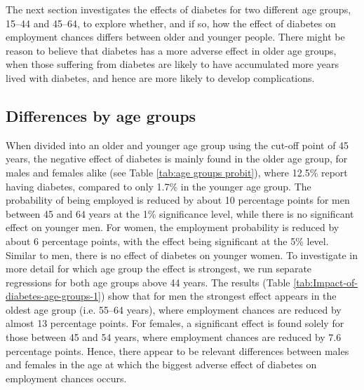 The next section investigates the effects of diabetes for
two different age groups, 15--44 and 45--64, to explore whether, and
if so, how the effect of diabetes on employment chances differs between
older and younger people. There might be reason to believe that diabetes
has a more adverse effect in older age groups, when those suffering
from diabetes are likely to have accumulated more years lived with
diabetes, and hence are more likely to develop complications. 

\FloatBarrier
\subsection{Differences by age groups }

When divided into an older and younger age group using the
cut-off point of 45 years, the negative effect of diabetes is mainly
found in the older age group, for males and females alike (see Table
\ref{tab:age groups probit}), where 12.5\% report having diabetes,
compared to only 1.7\% in the younger age group. The probability
of being employed is reduced by about 10 percentage points for men
between 45 and 64 years at the 1\% significance level, while
there is no significant effect on younger men. For women, the employment
probability is reduced by about 6 percentage points, with the effect
being significant at the 5\% level. Similar to men, there
is no effect of diabetes on younger women. To investigate in more
detail for which age group the effect is strongest, we run separate
regressions for both age groups above 44 years. The results (Table
\ref{tab:Impact-of-diabetes-age-groups-1}) show that
for men the strongest effect appears in the oldest age group (i.e.
55--64 years), where employment chances are reduced by almost 13 percentage
points. For females, a significant effect is found solely for those
between 45 and 54 years, where employment chances are reduced by 7.6
percentage points. Hence, there appear to be relevant differences
between males and females in the age at which the biggest adverse
effect of diabetes on employment chances occurs. 



